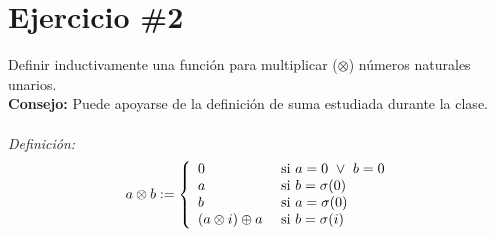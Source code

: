 \documentclass[11pt,letterpaper]{article}
\begin{document}
\section*{Ejercicio \#2}
\noindent Definir inductivamente una función para multiplicar ($\otimes$) números naturales unarios. \\
{\bf Consejo: }Puede apoyarse de la definición de suma estudiada durante la clase.
\\
\\
\emph{Definición:}
\[
	a\otimes b := \left\{
    \begin{array}{l l}
    	0 & \ \mbox{si } a=0 \ \lor \ b=0 \\
    	a & \ \mbox{si } b=\sigma(0) \\
        b & \ \mbox{si } a=\sigma(0) \\
        (a \otimes i) \oplus a & \ \mbox{si } b=\sigma(i) \\
	\end{array}
    \right.
\]
\end{document}

